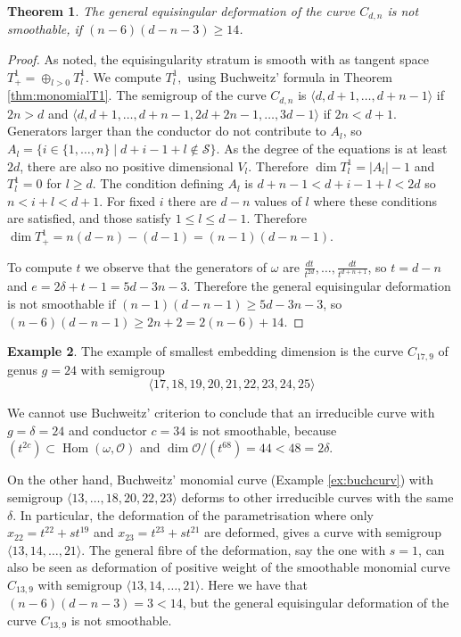 \documentclass{amsart}
\renewcommand{\S}{\mathcal S}
\DeclareMathOperator{\Hom}{Hom}
\renewcommand{\ell}{l}
\newcommand{\mO}{\mathcal{O}}
\newtheorem{thm}{Theorem}[section]
\theoremstyle{definition}
\newtheorem{ex}[thm]{Example}
\theoremstyle{remark}
\begin{document}
\begin{thm}
The general equisingular deformation of the curve $C_{d,n}$ is not smoothable, 
if  $(n-6)(d-n-3)\geq 14$.
\end{thm}
\begin{proof}
As noted, the equisingularity stratum is  smooth with as tangent space
$T^1_{+}=\oplus_{\ell>0} T^1_{\ell}$. We compute $T^1_{\ell},$ using Buchweitz' formula in
Theorem 
\ref{thm:monomialT1}.  The semigroup of the curve $C_{d,n}$
is  $\langle d,d+1,\dots,d+n-1\rangle$ if $2n> d$ and
$\langle d,d+1,\dots,d+n-1, 2d+2n-1, \dots, 3d-1\rangle$  if
$2n<d+1$. Generators larger than the conductor do not contribute to $A_{\ell}$,
so $A_{\ell}= \{i\in\{1,\dots,n\}\mid d+i-1+\ell\notin\S\}$.
As  the degree of the equations is at least $2d$, there are also no positive dimensional $V_{\ell}$.
Therefore  $\dim T^1_{\ell}=|A_{\ell}| -1$  and $T^1_{\ell}=0$
for $\ell\geq d$.
 The condition defining $A_{\ell}$ is
$d+n-1 < d+i-1 +\ell <2d$ so $n<i+\ell<d+1$. For fixed $i$ there are 
$d-n$ values of $\ell$ where these conditions are satisfied, and those satisfy $1\leq \ell \leq d-1$.  
Therefore $\dim T^{1}_{+} = n(d-n)-(d-1) =(n-1)(d-n-1)$.

To compute $t$ we observe that the generators of $\omega$ are
$\frac{dt}{t^{2d}},\dots,\frac{dt}{t^{d+n+1}}$, so $t=d-n$
and $e=2\delta+t-1 = 5d-3n-3$. Therefore the general equisingular deformation
is not smoothable if $(n-1)(d-n-1)\geq  5d-3n-3$, so $(n-6)(d-n-1)\geq  2n+2=2(n-6)+14$.
\end{proof}

\begin{ex}
The  example of smallest embedding dimension is the curve $C_{17,9}$ of  genus $g=24$ with 
semigroup 
\[\langle 17,18,19,20,21,22,23,24, 25 \rangle\]

We cannot use Buchweitz' criterion to conclude that an irreducible curve with
$g=\delta=24$ and conductor $c=34$ is not smoothable, because $(t^{2c})\subset \Hom(\omega,\mO)$
and $\dim \mO/(t^{68}) = 44 < 48=2\delta$.

On the other hand, Buchweitz' monomial curve (Example \ref{ex:buchcurv})
with semigroup $\langle 13,\dots,18, 20,22,23 \rangle$
deforms to other irreducible curves with the same $\delta$.
In particular, the deformation of the parametrisation where only $x_{22}=t^{22}+st^{19}$
and $x_{23}=t^{23}+st^{21}$ are deformed, gives a curve with 
semigroup $\langle 13,14,\dots,21\rangle$. 
The general fibre of the deformation, say the one with $s=1$, can also be seen
as deformation of positive weight of the smoothable  monomial curve $C_{13,9}$
with semigroup $\langle 13,14,\dots,21\rangle$. Here we have that 
$(n-6)(d-n-3)=3 <14$, but the general equisingular deformation of the curve 
$C_{13,9}$ is not smoothable.
\end{ex}
\end{document}
